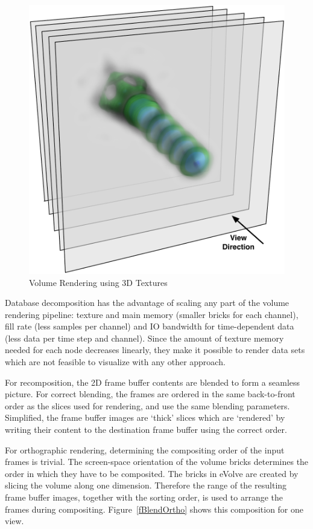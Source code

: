 \documentclass[10pt,a4]{scrartcl}
\newcommand{\fig}[1]{Figure~\ref{#1}}
\begin{document}
\begin{figure}
  \includegraphics[width=.382\textwidth]{images/slices.pdf}
  {\caption{\label{fSlices}Volume Rendering using 3D Textures}}
\end{figure}
Database decomposition has the advantage of scaling any part of the volume
rendering pipeline: texture and main memory (smaller bricks for each channel),
fill rate (less samples per channel) and IO bandwidth for time-dependent data
(less data per time step and channel). Since the amount of texture memory needed
for each node decreases linearly, they make it possible to render data sets
which are not feasible to visualize with any other approach.

For recomposition, the 2D frame buffer contents are blended to form a
seamless picture. For correct blending, the frames are ordered in the
same back-to-front order as the slices used for rendering, and use the
same blending parameters. Simplified, the frame buffer images are
`thick' slices which are `rendered' by writing their content to the
destination frame buffer using the correct order.

For orthographic rendering, determining the compositing order of the
input frames is trivial. The screen-space orientation of the volume
bricks determines the order in which they have to be composited. The
bricks in \textsf{eVolve} are created by slicing the volume along one
dimension. Therefore the range of the resulting frame buffer images,
together with the sorting order, is used to arrange the frames during
compositing. \fig{fBlendOrtho} shows this composition for one view.
\end{document}
